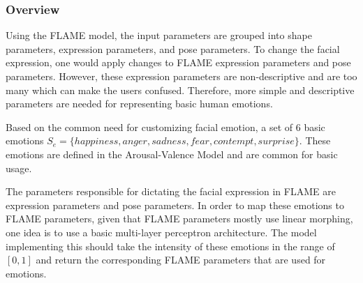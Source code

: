 \subsubsection{Overview}

Using the FLAME model, the input parameters are grouped into shape parameters, expression parameters, and pose parameters. To change the facial expression, one would apply changes to FLAME expression parameters and pose parameters. However, these expression parameters are non-descriptive and are too many which can make the users confused. Therefore, more simple and descriptive parameters are needed for representing basic human emotions.

Based on the common need for customizing facial emotion, a set of 6 basic emotions $S_e=\{ happiness, anger, sadness, fear, contempt, surprise\}$. These emotions are defined in the Arousal-Valence Model and are common for basic usage.

The parameters responsible for dictating the facial expression in FLAME are expression parameters and pose parameters. In order to map these emotions to FLAME parameters, given that FLAME parameters mostly use linear morphing, one idea is to use a basic multi-layer perceptron architecture. The model implementing this should take the intensity of these emotions in the range of $[0,1]$ and return the corresponding FLAME parameters that are used for emotions.